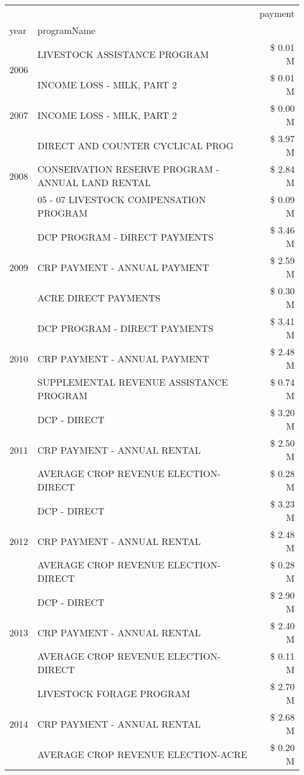 \begin{tabular}{llr}
\toprule
 &  & payment \\
year & programName &  \\
\midrule
\multirow[t]{2}{*}{2006} & LIVESTOCK ASSISTANCE PROGRAM & \$ 0.01 M \\
 & INCOME LOSS - MILK, PART 2 & \$ 0.01 M \\
\cline{1-3}
2007 & INCOME LOSS - MILK, PART 2 & \$ 0.00 M \\
\cline{1-3}
\multirow[t]{3}{*}{2008} & DIRECT AND COUNTER CYCLICAL PROG & \$ 3.97 M \\
 & CONSERVATION RESERVE PROGRAM - ANNUAL LAND RENTAL & \$ 2.84 M \\
 & 05 - 07 LIVESTOCK COMPENSATION PROGRAM & \$ 0.09 M \\
\cline{1-3}
\multirow[t]{3}{*}{2009} & DCP PROGRAM - DIRECT PAYMENTS & \$ 3.46 M \\
 & CRP PAYMENT - ANNUAL PAYMENT & \$ 2.59 M \\
 & ACRE DIRECT PAYMENTS & \$ 0.30 M \\
\cline{1-3}
\multirow[t]{3}{*}{2010} & DCP PROGRAM - DIRECT PAYMENTS & \$ 3.41 M \\
 & CRP PAYMENT - ANNUAL PAYMENT & \$ 2.48 M \\
 & SUPPLEMENTAL REVENUE ASSISTANCE PROGRAM & \$ 0.74 M \\
\cline{1-3}
\multirow[t]{3}{*}{2011} & DCP - DIRECT & \$ 3.20 M \\
 & CRP PAYMENT - ANNUAL RENTAL & \$ 2.50 M \\
 & AVERAGE CROP REVENUE ELECTION-DIRECT & \$ 0.28 M \\
\cline{1-3}
\multirow[t]{3}{*}{2012} & DCP - DIRECT & \$ 3.23 M \\
 & CRP PAYMENT - ANNUAL RENTAL & \$ 2.48 M \\
 & AVERAGE CROP REVENUE ELECTION-DIRECT & \$ 0.28 M \\
\cline{1-3}
\multirow[t]{3}{*}{2013} & DCP - DIRECT & \$ 2.90 M \\
 & CRP PAYMENT - ANNUAL RENTAL & \$ 2.40 M \\
 & AVERAGE CROP REVENUE ELECTION-DIRECT & \$ 0.11 M \\
\cline{1-3}
\multirow[t]{3}{*}{2014} & LIVESTOCK FORAGE PROGRAM & \$ 2.70 M \\
 & CRP PAYMENT - ANNUAL RENTAL & \$ 2.68 M \\
 & AVERAGE CROP REVENUE ELECTION-ACRE & \$ 0.20 M \\
\cline{1-3}

\end{tabular}
